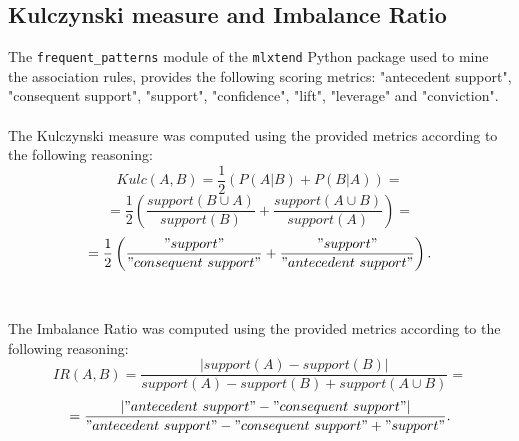 \documentclass[11pt,a4paper]{article}
\begin{document}
\subsection{Kulczynski measure and Imbalance Ratio}
The \texttt{frequent\_patterns} module of the \texttt{mlxtend} Python package
used to mine the association rules, provides the following scoring metrics:
"antecedent support", "consequent support", "support", "confidence", "lift",
"leverage" and "conviction".\\
\\
The Kulczynski measure was computed using the provided metrics according to the
following reasoning:
$$
    Kulc(A, B) = \frac{1}{2}\left(P(A|B) + P(B|A)\right) =
$$
\vspace*{0.1cm}
$$
    = \frac{1}{2}\left(\frac{support(B \cup A)}{support(B)} +
    \frac{support(A \cup B)}{support(A)}\right) =
$$
\vspace*{0.1cm}
$$
    = \frac{1}{2}\left(\frac{"support"}{"consequent\ support"} +
    \frac{"support"}{"antecedent\ support"}\right).
$$
\\
\\
The Imbalance Ratio was computed using the provided metrics according to the
following reasoning:
$$
    IR(A, B) = \frac{|support(A) - support(B)|}{support(A) - support(B)
    + support(A \cup B)} =
$$
\vspace*{0.1cm}
$$
    = \frac{|"antecedent\ support" - "consequent\ support"|}
    {"antecedent\ support" - "consequent\ support" + "support"}.
$$
\newpage
\printbibliography
\end{document}
